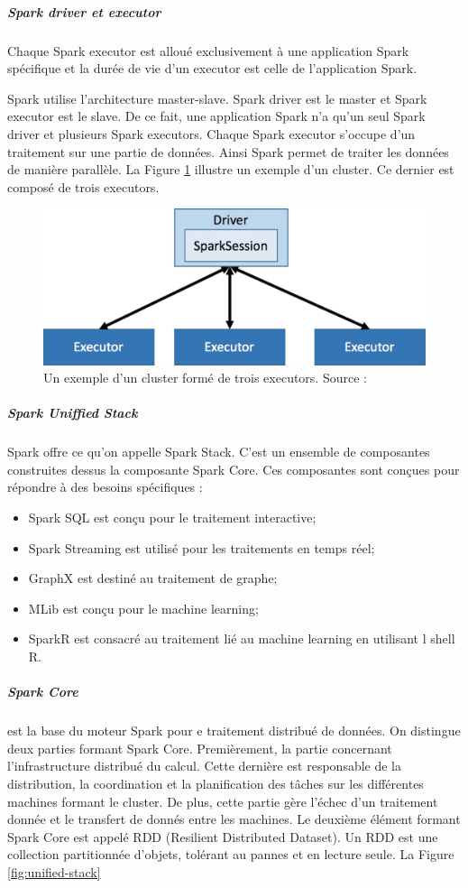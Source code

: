 \subparagraph{Spark driver et executor}

Chaque Spark executor est alloué exclusivement à une application Spark spécifique et la durée de vie d'un executor est celle de l'application Spark. 

Spark utilise l'architecture master-slave. Spark driver est le master et Spark executor est le slave. De ce fait, une application Spark n'a qu'un seul Spark driver et plusieurs Spark executors. Chaque Spark executor s'occupe d'un traitement  sur une partie de données. Ainsi Spark permet de traiter  les données de manière parallèle. La Figure \ref{fig:small-cluster-3} illustre un exemple d'un cluster. Ce dernier est composé de trois executors.
\begin{figure}[H]
	\centering
	\includegraphics[width=0.7\linewidth]{illustrations/small-cluster-3}
	\caption{Un exemple d'un cluster formé de trois executors. Source : \cite{eginning-Apache-Spark-2-cluster-example}}
	\label{fig:small-cluster-3}
\end{figure}


\subparagraph{Spark Uniffied Stack} Spark offre ce qu'on appelle Spark Stack. C'est un ensemble de composantes construites dessus la composante Spark Core.  Ces composantes sont conçues pour répondre à des besoins spécifiques :
\begin{itemize}
	\item Spark SQL  est conçu pour le traitement interactive;
	\item Spark Streaming est utilisé pour les traitements en temps réel;
	\item  GraphX est destiné au traitement de graphe;
	\item MLib est conçu pour le machine learning;
	\item SparkR est consacré au traitement lié au machine learning en utilisant l shell R.
	
\end{itemize}

\subparagraph{Spark Core} est la base du moteur Spark pour e traitement distribué de données.  On distingue deux parties formant Spark Core. Premièrement, la partie concernant l'infrastructure distribué du calcul. Cette dernière est responsable de la distribution, la coordination et la planification des tâches  sur les différentes machines formant le cluster. De plus, cette partie gère l'échec d'un traitement donnée et le transfert de donnés entre les machines. Le deuxième élément formant Spark Core est appelé RDD (Resilient Distributed Dataset). Un RDD est une collection partitionnée d'objets, tolérant au pannes et en lecture seule. 
La Figure \ref{fig:unified-stack} 

